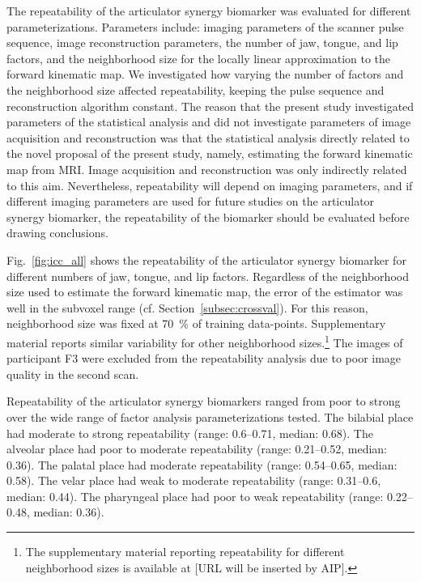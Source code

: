 \documentclass[preprint]{JASAnew}\usepackage[]{graphicx}\usepackage[]{color}
\begin{document}
The repeatability of the articulator synergy biomarker was evaluated for different parameterizations. 
%
Parameters include: imaging parameters of the scanner pulse sequence, image reconstruction parameters, the number of jaw, tongue, and lip factors, and the neighborhood size for the locally linear approximation to the forward kinematic map.
%
We investigated how varying the number of factors and the neighborhood size affected repeatability, keeping the pulse sequence and reconstruction algorithm constant. 
%
The reason that the present study investigated parameters of the statistical analysis and did not investigate parameters of image acquisition and reconstruction was that the statistical analysis directly related to the novel proposal of the present study, namely, estimating the forward kinematic map from MRI. Image acquisition and reconstruction was only indirectly related to this aim. 
%
Nevertheless, repeatability will depend on imaging parameters, and if different imaging parameters are used for future studies on the articulator synergy biomarker, the repeatability of the biomarker should be evaluated before drawing conclusions. 

Fig.~\ref{fig:icc_all} shows the repeatability of the articulator synergy biomarker for different numbers of jaw, tongue, and lip factors. 
%
Regardless of the neighborhood size used to estimate the forward kinematic map, the error of the estimator was well in the subvoxel range (cf. Section~\ref{subsec:crossval}). For this reason, neighborhood size was fixed at \SI{70}{\percent} of training data-points. Supplementary material reports similar variability for other neighborhood sizes.\footnote{The supplementary material reporting repeatability for different neighborhood sizes is available at [URL will be inserted by AIP].}
%
The images of participant F3 were excluded from the repeatability analysis due to poor image quality in the second scan. 



Repeatability of the articulator synergy biomarkers ranged from poor to strong over the wide range of factor analysis parameterizations tested. 
%
%
The bilabial place had
moderate  to  strong
repeatability
(range: \numrange{0.6}{0.71},
median: \num{0.68}). 
%
% 
The alveolar place had
poor  to  moderate
repeatability
(range: \numrange{0.21}{0.52},
median: \num{0.36}). 
%
%
The palatal place had
moderate
repeatability
(range: \numrange{0.54}{0.65},
median: \num{0.58}). 
%
%
The velar place had
weak  to  moderate
repeatability
(range: \numrange{0.31}{0.6},
median: \num{0.44}). 
%
%
The pharyngeal place had 
poor  to  weak
repeatability
(range: \numrange{0.22}{0.48},
median: \num{0.36}). 
\end{document}
